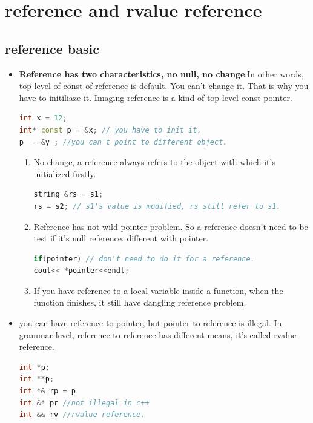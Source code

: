 \documentclass[a4paper,12pt,twoside]{book}
\begin{document}
\chapter{reference and rvalue reference}
\section{reference basic}

\begin{itemize}
\item \textbf{Reference has two characteristics, no null, no change}.In other words, top level of const of reference is default. You can't change it. That is why you have to initiliaze it. Imaging reference is a kind of top level const pointer.
\begin{lstlisting}[frame=single, language=c++]
int x = 12;
int* const p = &x; // you have to init it.
p  = &y ; //you can't point to different object.
\end{lstlisting}

\begin{enumerate}
\item No change, a reference always refers to the object with which it's initialized firstly.
\begin{lstlisting}[frame=single, language=c++]
string &rs = s1;
rs = s2; // s1's value is modified, rs still refer to s1.
\end{lstlisting}

\item Reference has not wild pointer problem. So a reference doesn't need to be test if it's null reference. different with pointer. 
\begin{lstlisting}[frame=single, language=c++]
if(pointer) // don't need to do it for a reference.
cout<< *pointer<<endl;
\end{lstlisting}

\item If you have reference to a local variable inside a function, when the function finishes, it still have dangling reference problem. 
\end{enumerate}

\item you can have reference to pointer, but pointer to reference is illegal. In grammar level, reference to reference has different means, it's called rvalue reference. 
\begin{lstlisting}[frame=single, language=c++]
int *p;
int **p;
int *& rp = p
int &* pr //not illegal in c++
int && rv //rvalue reference.
\end{lstlisting}


\end{itemize}
\end{document}
